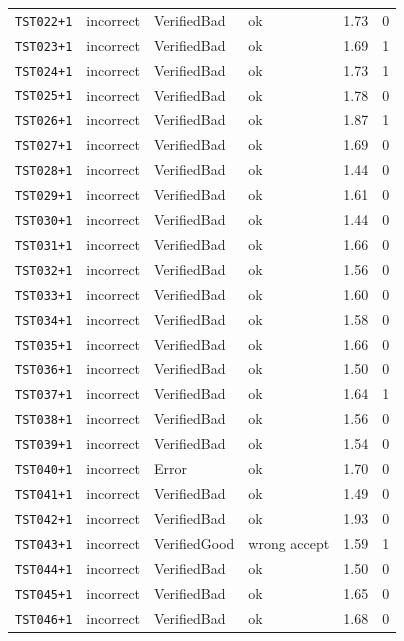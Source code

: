 \begin{longtable}{@{}l l l l r r@{}}
\texttt{TST022{+}1} & incorrect & VerifiedBad & ok & 1.73 & 0 \\
\texttt{TST023{+}1} & incorrect & VerifiedBad & ok & 1.69 & 1 \\
\texttt{TST024{+}1} & incorrect & VerifiedBad & ok & 1.73 & 1 \\
\texttt{TST025{+}1} & incorrect & VerifiedBad & ok & 1.78 & 0 \\
\texttt{TST026{+}1} & incorrect & VerifiedBad & ok & 1.87 & 1 \\
\texttt{TST027{+}1} & incorrect & VerifiedBad & ok & 1.69 & 0 \\
\texttt{TST028{+}1} & incorrect & VerifiedBad & ok & 1.44 & 0 \\
\texttt{TST029{+}1} & incorrect & VerifiedBad & ok & 1.61 & 0 \\
\texttt{TST030{+}1} & incorrect & VerifiedBad & ok & 1.44 & 0 \\
\texttt{TST031{+}1} & incorrect & VerifiedBad & ok & 1.66 & 0 \\
\texttt{TST032{+}1} & incorrect & VerifiedBad & ok & 1.56 & 0 \\
\texttt{TST033{+}1} & incorrect & VerifiedBad & ok & 1.60 & 0 \\
\texttt{TST034{+}1} & incorrect & VerifiedBad & ok & 1.58 & 0 \\
\texttt{TST035{+}1} & incorrect & VerifiedBad & ok & 1.66 & 0 \\
\texttt{TST036{+}1} & incorrect & VerifiedBad & ok & 1.50 & 0 \\
\texttt{TST037{+}1} & incorrect & VerifiedBad & ok & 1.64 & 1 \\
\texttt{TST038{+}1} & incorrect & VerifiedBad & ok & 1.56 & 0 \\
\texttt{TST039{+}1} & incorrect & VerifiedBad & ok & 1.54 & 0 \\
\texttt{TST040{+}1} & incorrect & Error & ok & 1.70 & 0 \\
\texttt{TST041{+}1} & incorrect & VerifiedBad & ok & 1.49 & 0 \\
\texttt{TST042{+}1} & incorrect & VerifiedBad & ok & 1.93 & 0 \\
\texttt{TST043{+}1} & incorrect & VerifiedGood & wrong accept & 1.59 & 1 \\
\texttt{TST044{+}1} & incorrect & VerifiedBad & ok & 1.50 & 0 \\
\texttt{TST045{+}1} & incorrect & VerifiedBad & ok & 1.65 & 0 \\
\texttt{TST046{+}1} & incorrect & VerifiedBad & ok & 1.68 & 0 \\

\end{longtable}
